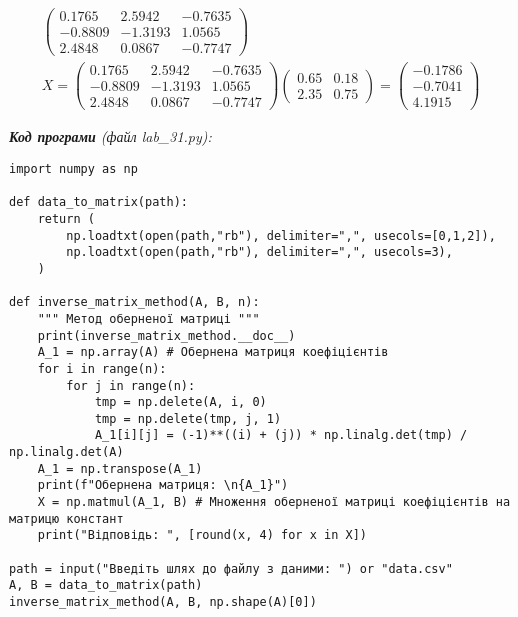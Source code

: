\documentclass{article}
\newcommand\lab{3}
\begin{document}
\begin{large}
\begin{gather}
\begin{pmatrix}
				0.1765 & 2.5942 & -0.7635\\
				-0.8809 & -1.3193 & 1.0565\\
				2.4848 & 0.0867 & -0.7747
			\end{pmatrix}
			\\
			X=\begin{pmatrix}\nonumber
				0.1765 & 2.5942 & -0.7635\\
				-0.8809 & -1.3193 & 1.0565\\
				2.4848 & 0.0867 & -0.7747
			\end{pmatrix}
			\begin{pmatrix}\nonumber
				0.65 & 0.18\\
				2.35 & 0.75
			\end{pmatrix}
			=
			\begin{pmatrix}
				-0.1786\\
				-0.7041\\
				4.1915
			\end{pmatrix}
		\end{gather}
			
		\noindent\textit{\textbf{Код програми} (файл lab\_\lab1.py):}
		\begin{lstlisting}
import numpy as np

def data_to_matrix(path):
	return (
		np.loadtxt(open(path,"rb"), delimiter=",", usecols=[0,1,2]),
		np.loadtxt(open(path,"rb"), delimiter=",", usecols=3),
	)

def inverse_matrix_method(A, B, n):
	""" Метод оберненої матриці """
	print(inverse_matrix_method.__doc__)
	A_1 = np.array(A) # Обернена матриця коефіцієнтів
	for i in range(n):
		for j in range(n):
			tmp = np.delete(A, i, 0)
			tmp = np.delete(tmp, j, 1)
			A_1[i][j] = (-1)**((i) + (j)) * np.linalg.det(tmp) / np.linalg.det(A)
	A_1 = np.transpose(A_1)
	print(f"Обернена матриця: \n{A_1}")
	X = np.matmul(A_1, B) # Множення оберненої матриці коефіцієнтів на матрицю констант
	print("Відповідь: ", [round(x, 4) for x in X])

path = input("Введіть шлях до файлу з даними: ") or "data.csv"
A, B = data_to_matrix(path)
inverse_matrix_method(A, B, np.shape(A)[0])\end{lstlisting}


\end{large}
\end{document}

